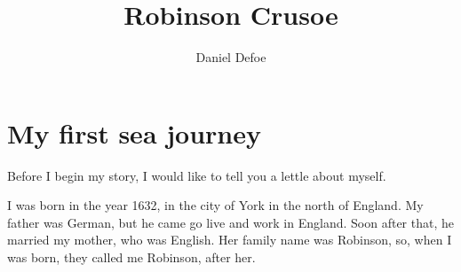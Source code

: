 \documentclass{ctexart}
\author{Daniel Defoe}
\date{}
\title{Robinson Crusoe}
\begin{document}
\maketitle
\tableofcontents



\section{My first sea journey}
\label{sec-1}
Before I begin my story, I would like to tell you a lettle about myself.

I was born in the year 1632, in the city of York in the north of England. My father was German, but he came go live and work in England. Soon after that, he married my mother, who was English. Her family name was Robinson, so, when I was born, they called me Robinson, after her.
\end{document}
